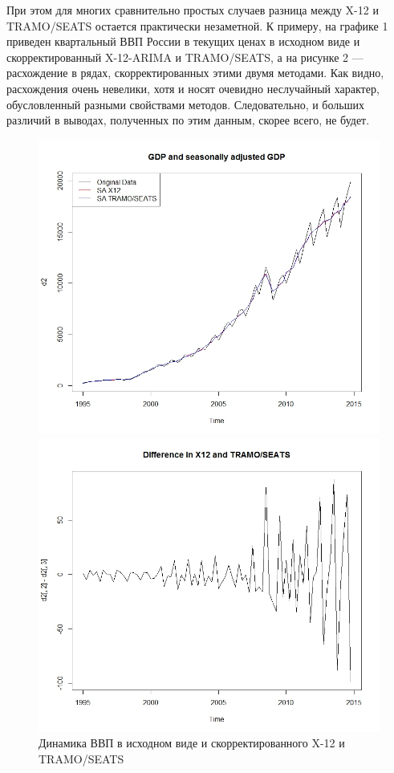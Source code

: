 \documentclass[final,pdftex]{../../template/epsilonj}\usepackage[]{graphicx}\usepackage[]{color}
\begin{document}
При этом для многих сравнительно простых случаев разница между X-12 и TRAMO/SEATS остается практически незаметной. К примеру, на графике 1 приведен квартальный ВВП России в текущих ценах в исходном виде и скорректированный X-12-ARIMA и TRAMO/SEATS, а на рисунке 2 --- расхождение в рядах, скорректированных этими двумя методами. Как видно, расхождения очень невелики, хотя и носят очевидно неслучайный характер, обусловленный разными свойствами методов. Следовательно, и больших различий в выводах, полученных по этим данным, скорее всего, не будет. 

\begin{figure}
\centering
\begin{minipage}{.48\textwidth}
  \centering
  \includegraphics[width=\linewidth]{eps_seas1.jpg}
  \caption{Динамика ВВП в исходном виде и скорректированного X-12 и TRAMO/SEATS}
  \label{fig:test1}
\end{minipage}%
\begin{minipage}{.48\textwidth}
  \centering
  \includegraphics[width=\linewidth]{eps_seas2.jpg}

\end{minipage}
\end{figure}
\end{document}
